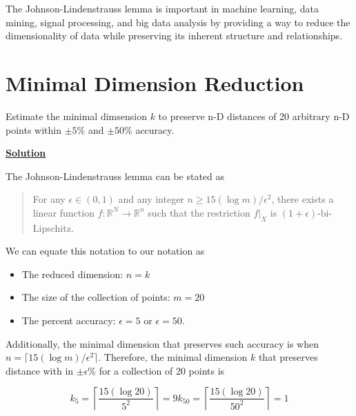 \documentclass{article}
\renewcommand{\_}{\ifincsname_\else\legacyunderscore\fi}
\begin{document}
The Johnson-Lindenstrauss lemma is important in machine learning, data mining, signal processing, and big data analysis by providing a way to reduce the dimensionality of data while preserving its inherent structure and relationships.


\section*{Minimal Dimension Reduction}

    Estimate the minimal dimsension $k$ to preserve n-D distances of 20 arbitrary n-D points within $\pm5\%$ and $\pm50\%$ accuracy.

    \underline{\textbf{Solution}}

    The Johnson-Lindenstrauss lemma can be stated as 

    \begin{quote}
        For any $\epsilon \in (0,1)$ and any integer $n \geq 15(\log m) / \epsilon^2$, there exists a linear function $f: \mathbb{R}^N \to \mathbb{R}^n$ such that the restriction $f|_X$ is $(1 + \epsilon)$-bi-Lipschitz.
    \end{quote}

    We can equate this notation to our notation as

    \begin{itemize}
        \item The reduced dimension: $n = k$
        \item The size of the collection of points: $m = 20$
        \item The percent accuracy: $\epsilon = 5$ or $\epsilon = 50$.
    \end{itemize}

    Additionally, the minimal dimension that preserves such accuracy is when $n = \lceil 15(\log m) / \epsilon^2 \rceil$. Therefore, the minimal dimension $k$ that preserves distance with in $\pm\epsilon\%$ for a collection of 20 points is 

    \begin{subequations}
        \begin{equation*}
            k_5 = \left\lceil \frac{15 (\log 20)}{5^2} \right\rceil = 9
        \end{equation*}
        \begin{equation*}
            k_{50} = \left\lceil \frac{15 (\log 20)}{50^2} \right\rceil = 1
        \end{equation*}    
    \end{subequations}
    
\end{document}
